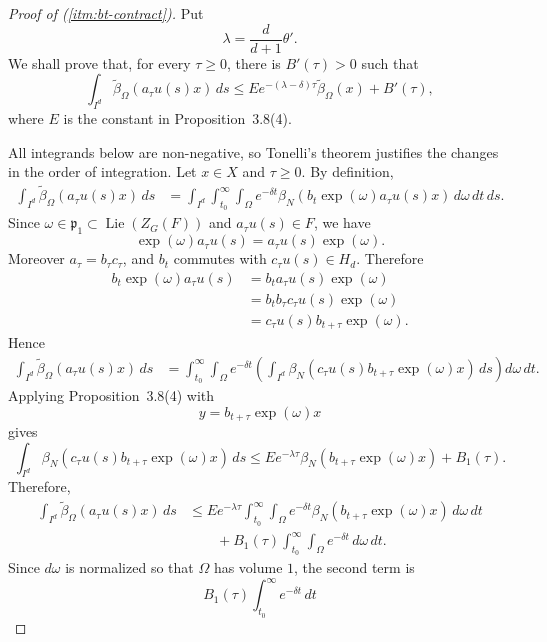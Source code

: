 \documentclass[12pt,reqno]{amsart}
\numberwithin{equation}{section}
\theoremstyle{plain}
\theoremstyle{definition}
\theoremstyle{remark}
\newcommand\fp{\mathfrak{p}}
\begin{document}
\begin{proof}[Proof of (\ref{itm:bt-contract})] 

Put
\[
\lambda=\frac{d}{d+1}\theta'.
\]
We shall prove that, for every $\tau\geq 0$, there is $B'(\tau)>0$ such that
\[
\int_{I^d}\widetilde\beta_\Omega(a_\tau u(s)x)\,ds
\leq
E e^{-(\lambda-\delta)\tau}\widetilde\beta_\Omega(x)+B'(\tau),
\]
where $E$ is the constant in Proposition~3.8(4). 

All integrands below are non-negative, so Tonelli's theorem justifies the changes
in the order of integration. Let $x\in X$ and $\tau\geq 0$. By definition,
\[
\begin{aligned}
\int_{I^d}\widetilde\beta_\Omega(a_\tau u(s)x)\,ds
&=
\int_{I^d}\int_{t_0}^{\infty}\int_{\Omega}
e^{-\delta t}
\beta_N\!\left(b_t\exp(\omega)a_\tau u(s)x\right)
\,d\omega\,dt\,ds .
\end{aligned}
\]
Since $\omega\in\fp_1\subset \operatorname{Lie}(Z_G(F))$ and
$a_\tau u(s)\in F$, we have
\[
\exp(\omega)a_\tau u(s)=a_\tau u(s)\exp(\omega).
\]
Moreover $a_\tau=b_\tau c_\tau$, and $b_t$ commutes with $c_\tau u(s)\in H_d$.
Therefore
\[
\begin{aligned}
b_t\exp(\omega)a_\tau u(s)
&=
b_ta_\tau u(s)\exp(\omega)  \\
&=
b_tb_\tau c_\tau u(s)\exp(\omega) \\
&=
c_\tau u(s)b_{t+\tau}\exp(\omega).
\end{aligned}
\]
Hence
\[
\begin{aligned}
\int_{I^d}\widetilde\beta_\Omega(a_\tau u(s)x)\,ds
&=
\int_{t_0}^{\infty}\int_{\Omega}
e^{-\delta t}
\left(
\int_{I^d}
\beta_N\!\left(c_\tau u(s)b_{t+\tau}\exp(\omega)x\right)
\,ds
\right)
d\omega\,dt .
\end{aligned}
\]
Applying Proposition~3.8(4) with
\[
y=b_{t+\tau}\exp(\omega)x
\]
gives
\[
\int_{I^d}
\beta_N\!\left(c_\tau u(s)b_{t+\tau}\exp(\omega)x\right)
\,ds
\leq
E e^{-\lambda \tau}\beta_N\!\left(b_{t+\tau}\exp(\omega)x\right)
+B_1(\tau).
\]
Therefore,
\[
\begin{aligned}
\int_{I^d}\widetilde\beta_\Omega(a_\tau u(s)x)\,ds
&\leq
E e^{-\lambda\tau}
\int_{t_0}^{\infty}\int_{\Omega}
e^{-\delta t}
\beta_N\!\left(b_{t+\tau}\exp(\omega)x\right)
\,d\omega\,dt  \\
&\qquad
+
B_1(\tau)\int_{t_0}^{\infty}\int_{\Omega}e^{-\delta t}\,d\omega\,dt .
\end{aligned}
\]
Since $d\omega$ is normalized so that $\Omega$ has volume $1$, the second term is
\[
B_1(\tau)\int_{t_0}^{\infty}e^{-\delta t}\,dt
\]
\end{proof}
\end{document}
